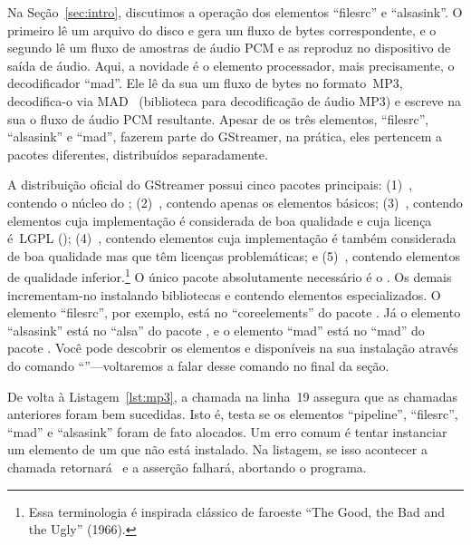 \documentclass{SBCbookchapter}
\begin{document}


Na Seção~\ref{sec:intro}, discutimos a operação dos elementos ``filesrc'' e
``alsasink''.  O primeiro lê um arquivo do disco e gera um fluxo de bytes
correspondente, e o segundo lê um fluxo de amostras de áudio PCM e as
reproduz no dispositivo de saída de áudio.  Aqui, a novidade é o elemento
processador, mais precisamente, o decodificador ``mad''.  Ele lê da sua
 um fluxo de bytes no formato~MP3, decodifica-o via
MAD~\cite{mad} (biblioteca para decodificação de áudio MP3) e escreve na sua
 o fluxo de áudio PCM resultante.  
Apesar de os três elementos,
``filesrc'', ``alsasink'' e ``mad'', fazerem parte do GStreamer, na prática,
eles pertencem a pacotes diferentes, distribuídos separadamente.

A distribuição oficial do GStreamer possui cinco pacotes principais:
(1)~, contendo o núcleo do ;
(2)~, contendo apenas os elementos básicos;
(3)~, contendo elementos cuja implementação é
considerada de boa qualidade e cuja licença é~LGPL (); (4)~, contendo elementos cuja
implementação é também considerada de boa qualidade mas que têm licenças
problemáticas; e (5)~, contendo elementos de qualidade
inferior.\footnote{Essa terminologia é inspirada clássico de faroeste ``The
  Good, the Bad and the Ugly'' (1966).}  O único pacote absolutamente
necessário é o .  Os demais incrementam-no instalando
bibliotecas e  contendo elementos especializados.  O elemento
``filesrc'', por exemplo, está no  ``coreelements'' do pacote
.  Já o elemento ``alsasink'' está no  ``alsa'' do
pacote , e o elemento ``mad'' está no 
``mad'' do pacote .  Você pode descobrir os elementos e
 disponíveis na sua instalação através do comando
``''---voltaremos a falar desse comando no final da seção.

De volta à Listagem~\ref{lst:mp3}, a chamada  na linha~19
assegura que as chamadas  anteriores foram bem
sucedidas.  Isto é, testa se os elementos ``pipeline'', ``filesrc'', ``mad''
e ``alsasink'' foram de fato alocados.  Um erro comum é tentar instanciar um
elemento de um  que não está instalado.  Na listagem, se isso
acontecer a chamada  retornará~ e a
asserção falhará, abortando o programa.
\end{document}
